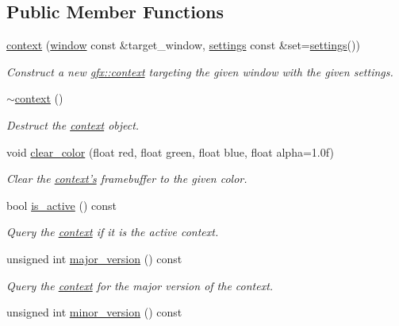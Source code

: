 \subsection*{Public Member Functions}
\begin{DoxyCompactItemize}
\item 
\hyperlink{classgfx_1_1context_a7994d7183d5febf0b66f8e574d172180}{context} (\hyperlink{classgfx_1_1window}{window} const \&target\-\_\-window, \hyperlink{classgfx_1_1context_1_1settings}{settings} const \&set=\hyperlink{classgfx_1_1context_1_1settings}{settings}())
\begin{DoxyCompactList}\small\item\em Construct a new \hyperlink{classgfx_1_1context}{gfx\-::context} targeting the given window with the given settings. \end{DoxyCompactList}\item 
\hyperlink{classgfx_1_1context_a02588dfb533acd93bab925211bb48273}{$\sim$context} ()
\begin{DoxyCompactList}\small\item\em Destruct the \hyperlink{classgfx_1_1context}{context} object. \end{DoxyCompactList}\item 
void \hyperlink{classgfx_1_1context_abd71c661a4eaf846a10b15ad36e2b117}{clear\-\_\-color} (float red, float green, float blue, float alpha=1.\-0f)
\begin{DoxyCompactList}\small\item\em Clear the \hyperlink{classgfx_1_1context}{context's} framebuffer to the given color. \end{DoxyCompactList}\item 
bool \hyperlink{classgfx_1_1context_a49cbe1635efb5446884361c883b9756e}{is\-\_\-active} () const 
\begin{DoxyCompactList}\small\item\em Query the \hyperlink{classgfx_1_1context}{context} if it is the active context. \end{DoxyCompactList}\item 
unsigned int \hyperlink{classgfx_1_1context_aa16d73f975660c691ec1b23d2b357838}{major\-\_\-version} () const 
\begin{DoxyCompactList}\small\item\em Query the \hyperlink{classgfx_1_1context}{context} for the major version of the context. \end{DoxyCompactList}\item 
unsigned int \hyperlink{classgfx_1_1context_a42b72fb029aab81096e576b3a8a7de52}{minor\-\_\-version} () const 

\end{DoxyCompactItemize}
